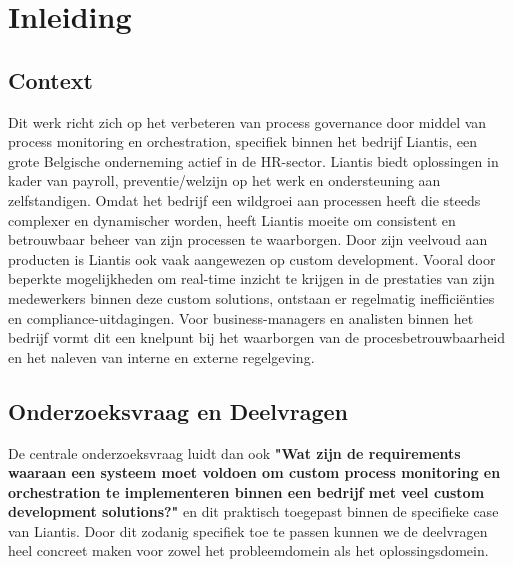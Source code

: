 
\section{Inleiding}%
\label{sec:inleiding}

\subsection{Context}

Dit werk richt zich op het verbeteren van process governance door middel van process monitoring en orchestration, specifiek binnen het bedrijf Liantis, een grote Belgische onderneming actief in de HR-sector. Liantis biedt oplossingen in kader van payroll, preventie/welzijn op het werk en ondersteuning aan zelfstandigen. Omdat het bedrijf een wildgroei aan processen heeft die steeds complexer en dynamischer worden, heeft Liantis moeite om consistent en betrouwbaar beheer van zijn processen te waarborgen. Door zijn veelvoud aan producten is Liantis ook vaak aangewezen op custom development. Vooral door beperkte mogelijkheden om real-time inzicht te krijgen in de prestaties van zijn medewerkers binnen deze custom solutions, ontstaan er regelmatig inefficiënties en compliance-uitdagingen. Voor business-managers en analisten binnen het bedrijf vormt dit een knelpunt bij het waarborgen van de procesbetrouwbaarheid en het naleven van interne en externe regelgeving. 

\subsection{Onderzoeksvraag en Deelvragen}
De centrale onderzoeksvraag luidt dan ook \textbf{"Wat zijn de requirements waaraan een systeem moet voldoen om custom process monitoring en orchestration te implementeren binnen een bedrijf met veel custom development solutions?"} en dit praktisch toegepast binnen de specifieke case van Liantis. Door dit zodanig specifiek toe te passen kunnen we de deelvragen heel concreet maken voor zowel het probleemdomein als het oplossingsdomein.

